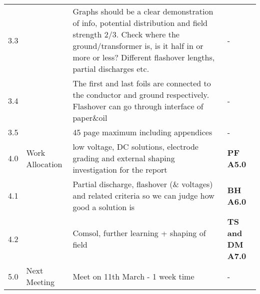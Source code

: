 \begin{center}
\begin{longtable}{| p{} |>{\raggedright\arraybackslash}p{} | p{} |>{\raggedright\arraybackslash}p{}|}
3.3 	& 				&	Graphs should be a clear demonstration of info, potential distribution and field strength 2/3. Check where the ground/transformer is, is it half in or more or less? Different flashover lengths, partial discharges etc.& - \\
3.4 	& 				&	The first and last foils are connected to the conductor and ground respectively. Flashover can go through interface of paper\&oil& - \\
3.5 	& 				&	45 page maximum including appendices& - \\ \hline
4.0	&	Work Allocation	& low voltage, DC solutions, electrode grading and external shaping investigation for the report & \textbf{PF A5.0} \\ 
4.1	&				& Partial discharge, flashover (\& voltages) and related criteria so we can judge how good a solution is & \textbf{BH A6.0} \\ 
4.2	&				& Comsol, further learning + shaping of field & \textbf{TS and DM A7.0} \\  \hline
5.0	&	Next Meeting	&	Meet on 11th March - 1 week time & - \\ \hline

\end{longtable}
\end{center}

